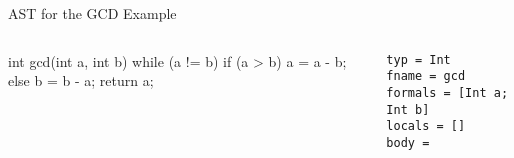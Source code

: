 \documentclass{plt}
\begin{document}
\begin{frame}[fragile=singleslide,t]{AST for the GCD Example}

\begin{columns}
\begin{column}{0.5\textwidth}
\begin{C}
int gcd(int a, int b) {
  while (a != b)
    if (a > b) a = a - b;
    else b = b - a;
  return a;
}
\end{C}
\end{column}
\begin{column}{0.5\textwidth}
\begin{verbatim}
typ = Int
fname = gcd
formals = [Int a; Int b]
locals = []
body = 
\end{verbatim}
\end{column}
\end{columns}


\end{frame}
\end{document}

